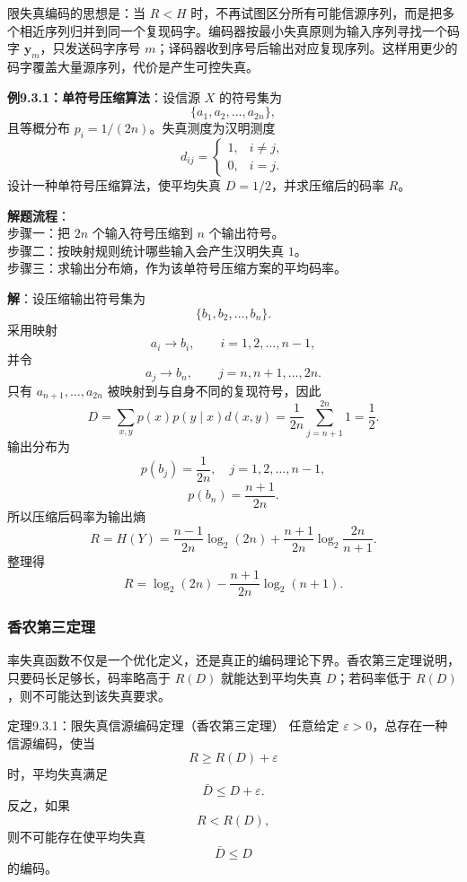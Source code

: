 限失真编码的思想是：当 $R<H$ 时，不再试图区分所有可能信源序列，而是把多个相近序列归并到同一个复现码字。编码器按最小失真原则为输入序列寻找一个码字 $\mathbf y_m$，只发送码字序号 $m$；译码器收到序号后输出对应复现序列。这样用更少的码字覆盖大量源序列，代价是产生可控失真。

\begin{example}
\label{ex:ch9-single-symbol-compression}
\textbf{例9.3.1：单符号压缩算法}：设信源 $X$ 的符号集为
\[
\{a_1,a_2,\dots,a_{2n}\},
\]
且等概分布 $p_i=1/(2n)$。失真测度为汉明测度
\[
d_{ij}=
\begin{cases}
1, & i\ne j,\\
0, & i=j.
\end{cases}
\]
设计一种单符号压缩算法，使平均失真 $D=1/2$，并求压缩后的码率 $R$。

\noindent \textbf{解题流程}：\\[2pt]
步骤一：把 $2n$ 个输入符号压缩到 $n$ 个输出符号。\\
步骤二：按映射规则统计哪些输入会产生汉明失真 $1$。\\
步骤三：求输出分布熵，作为该单符号压缩方案的平均码率。

\textbf{解}：设压缩输出符号集为
\[
\{b_1,b_2,\dots,b_n\}.
\]
采用映射
\[
a_i\to b_i,
\qquad i=1,2,\dots,n-1,
\]
并令
\[
a_j\to b_n,
\qquad j=n,n+1,\dots,2n.
\]
只有 $a_{n+1},\dots,a_{2n}$ 被映射到与自身不同的复现符号，因此
\[
D=\sum_{x,y}p(x)p(y\mid x)d(x,y)
=\frac{1}{2n}\sum_{j=n+1}^{2n}1
=\frac12.
\]
输出分布为
\[
p(b_j)=\frac{1}{2n},\quad j=1,2,\dots,n-1,
\]
\[
p(b_n)=\frac{n+1}{2n}.
\]
所以压缩后码率为输出熵
\[
R=H(Y)=\frac{n-1}{2n}\log_2(2n)
+\frac{n+1}{2n}\log_2\frac{2n}{n+1}.
\]
整理得
\[
R=\log_2(2n)-\frac{n+1}{2n}\log_2(n+1).
\]
\end{example}

\subsubsection{香农第三定理}

率失真函数不仅是一个优化定义，还是真正的编码理论下界。香农第三定理说明，只要码长足够长，码率略高于 $R(D)$ 就能达到平均失真 $D$；若码率低于 $R(D)$，则不可能达到该失真要求。

\begin{theoremBox}{定理9.3.1：限失真信源编码定理（香农第三定理）}
任意给定 $\varepsilon>0$，总存在一种信源编码，使当
\[
R\ge R(D)+\varepsilon
\]
时，平均失真满足
\[
\bar D\le D+\varepsilon.
\]
反之，如果
\[
R<R(D),
\]
则不可能存在使平均失真
\[
\bar D\le D
\]
的编码。
\end{theoremBox}

